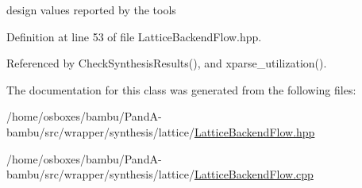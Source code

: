 design values reported by the tools 



Definition at line 53 of file Lattice\+Backend\+Flow.\+hpp.



Referenced by Check\+Synthesis\+Results(), and xparse\+\_\+utilization().



The documentation for this class was generated from the following files\+:\begin{DoxyCompactItemize}
\item 
/home/osboxes/bambu/\+Pand\+A-\/bambu/src/wrapper/synthesis/lattice/\hyperlink{LatticeBackendFlow_8hpp}{Lattice\+Backend\+Flow.\+hpp}\item 
/home/osboxes/bambu/\+Pand\+A-\/bambu/src/wrapper/synthesis/lattice/\hyperlink{LatticeBackendFlow_8cpp}{Lattice\+Backend\+Flow.\+cpp}\end{DoxyCompactItemize}
